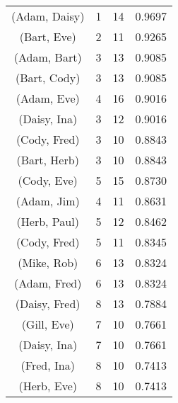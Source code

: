 \begin{table*}[t]
{\begin{tabular}{@{\hspace{.2cm}}ccc@{\hspace{.75cm}}c@{\hspace{.2cm}}}
(Adam, Daisy)	&	1&	14&	0.9697	\\ %
(Bart, Eve)	&	2&	11&	0.9265	\\ %
(Adam, Bart)	&	3&	13&	0.9085	\\ %
(Bart, Cody)	&	3&	13&	0.9085	\\ %
(Adam, Eve)	&	4&	16&	0.9016	\\ %
(Daisy, Ina)	&	3&	12&	0.9016	\\ %
(Cody, Fred)	&	3&	10&	0.8843	\\ %
(Bart, Herb)	&	3&	10&	0.8843	\\ %
(Cody, Eve)	&	5&	15&	0.8730	\\ %
(Adam, Jim)	&	4&	11&	0.8631	\\ %
(Herb, Paul)	&	5&	12&	0.8462	\\ %
(Cody, Fred)	&	5&	11&	0.8345	\\ %
(Mike, Rob)	&	6&	13&	0.8324	\\ %
(Adam, Fred)	&	6&	13&	0.8324	\\ %
(Daisy, Fred)	&	8&	13&	0.7884	\\ %
(Gill, Eve)		&	7&	10&	0.7661	\\ %
(Daisy, Ina)	&	7&	10&	0.7661	\\ %
(Fred, Ina)	&	8&	10&	0.7413	\\ %
(Herb, Eve)	&	8&	10&	0.7413	\\ %
\bottomrule
\end{tabular}
\label{tab:badtechpairs}
}\hspace{1.3cm}
%
\end{table*}
